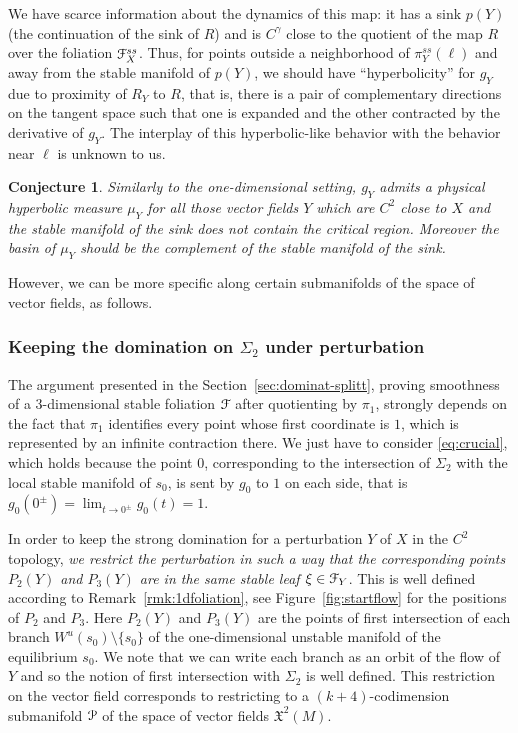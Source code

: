 \documentclass[reqno,12pt,a4paper]{amsart}
\theoremstyle{plain}
\newtheorem{conjecture}{Conjecture}
\theoremstyle{definition}
\begin{document}
We have scarce information about the dynamics of this map:
it has a sink $p(Y)$ (the continuation of the sink of $R$)
and is $C^\gamma$ close to the quotient of the map $R$ over
the foliation ${\EuScript{F}}^{ss}_X$. Thus, for points outside a
neighborhood of $\pi_Y^{ss}(\ell)$ and away from the stable
manifold of $p(Y)$, we should have ``hyperbolicity'' for
$g_Y$ due to proximity of $R_Y$ to $R$, that is, there is a
pair of complementary directions on the tangent space such
that one is expanded and the other contracted by the
derivative of $g_Y$. The interplay of this hyperbolic-like
behavior with the behavior near $\ell$ is unknown to us.

\begin{conjecture}\label{conj:physicalViana}
  Similarly to the one-dimensional setting, \emph{$g_Y$
    admits a physical hyperbolic measure $\mu_Y$ for all
    those vector fields $Y$ which are $C^2$ close to $X$ and
    the stable manifold of the sink does not contain the
    critical region.} Moreover the basin of $\mu_Y$ should
  be the complement of the stable manifold of the sink.
\end{conjecture}

However, we can be more specific along certain submanifolds
of the space of vector fields, as follows.

\subsubsection{Keeping the domination on $\Sigma_2$ under
  perturbation}
\label{sec:keeping-dominat}

The argument presented in the
Section~\ref{sec:dominat-splitt}, proving smoothness of a
$3$-dimensional stable foliation ${\EuScript{F}}$ after quotienting by
$\pi_1$, strongly depends on the fact that $\pi_1$
identifies every point whose first coordinate is $1$, which
is represented by an infinite contraction there. We just
have to consider \eqref{eq:crucial}, which holds because the
point $0$, corresponding to the intersection of $\Sigma_2$
with the local stable manifold of $s_0$, is sent by $g_0$ to
$1$ on each side, that is
$g_0(0^\pm)=\lim_{t\to0^\pm}g_0(t)=1$.

In order to keep the strong domination for a perturbation
$Y$ of $X$ in the $C^2$ topology, \emph{we restrict the
  perturbation in such a way that the corresponding points
  $P_2(Y)$ and $P_3(Y)$ are in the same stable leaf
  $\xi\in{\EuScript{F}}_Y$}. This is well defined according to
Remark~\ref{rmk:1dfoliation}, see Figure~\ref{fig:startflow}
for the positions of $P_2$ and $P_3$.  Here $P_2(Y)$ and
$P_3(Y)$ are the points of first intersection of each branch
$W^u(s_0)\setminus\{s_0\}$ of the one-dimensional unstable
manifold of the equilibrium $s_0$. We note that we can write
each branch as an orbit of the flow of $Y$ and so the notion
of first intersection with $\Sigma_2$ is well defined. This
restriction on the vector field corresponds to restricting
to a $(k+4)$-codimension submanifold ${\EuScript{P}}$ of the space of
vector fields ${{\mathfrak X}}^2(M)$.
\end{document}
